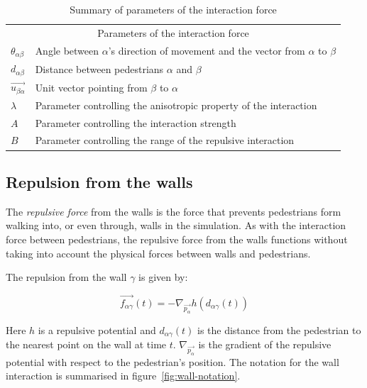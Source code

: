 \begin{table}
    \centering
    \begin{tabular}{l l}
        \toprule
        \multicolumn{2}{c}{\textsf{Parameters of the interaction force}}\\
        $\theta_{\alpha \beta}$ & Angle between $\alpha$'s direction of 
        movement and the vector from $\alpha$ to $\beta$\\
        $d_{\alpha \beta}$& Distance between pedestrians $\alpha$ and $\beta$ \\
        $\overrightarrow{u_{\beta \alpha}}$& Unit vector pointing from $\beta$ to $\alpha$ \\
        $\lambda$& Parameter controlling the anisotropic property of the 
        interaction\\
        $A$& Parameter controlling the interaction strength \\
        $B$& Parameter controlling the range of the repulsive interaction  \\
        \bottomrule
    \end{tabular}
    \caption{Summary of parameters of the interaction force}
    \label{tbl:interaction-forces}
\end{table}

\subsection{Repulsion from the walls}
\label{seq:repulsion-walls}
The \emph{repulsive force} from the walls is the force that prevents 
pedestrians form walking into, or even through, walls in the simulation. As 
with the interaction force between pedestrians, the repulsive force from the 
walls functions without taking into account the physical forces between walls 
and pedestrians.

The repulsion from the wall $\gamma$ is given by:

\begin{equation}\label{wallpotential}
    \overrightarrow{f_{\alpha \gamma}}(t) =
    - \nabla_{\overrightarrow{p_{\alpha}}} h
    \left( d_{\alpha \gamma}(t) \right)
\end{equation}

Here $h$ is a repulsive potential and $d_{\alpha \gamma}(t)$ is the distance 
from the pedestrian to the nearest point on the wall at time $t$. 
$\nabla_{\overrightarrow{p_\alpha}}$ is the gradient of the repulsive 
potential with respect to the pedestrian's position. The notation for the wall 
interaction is summarised in figure~\ref{fig:wall-notation}.

